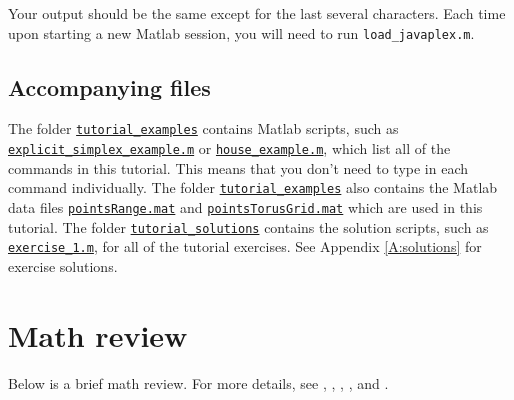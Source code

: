 \documentclass[amscd, amssymb, verbatim]{amsart}[12pt]
\theoremstyle{remark}
\theoremstyle{remark}
\theoremstyle{remark}
\begin{document}
Your output should be the same except for the last several characters. Each time upon starting a new Matlab session, you will need to run \texttt{load\_javaplex.m}.


\subsection{Accompanying files}

The folder \href{https://github.com/appliedtopology/javaplex/tree/master/src/matlab/for_distribution/tutorial_examples}{\texttt{tutorial\_examples}} contains Matlab scripts, such as \\ %
\href{https://github.com/appliedtopology/javaplex/tree/master/src/matlab/for_distribution/tutorial_examples/explicit_simplex_example.m}{\texttt{explicit\_simplex\_example.m}} or \href{https://github.com/appliedtopology/javaplex/tree/master/src/matlab/for_distribution/tutorial_examples/house_example.m}{\texttt{house\_example.m}}, which list all of the commands in this tutorial. This means that you don't need to type in each command individually. The folder \href{https://github.com/appliedtopology/javaplex/tree/master/src/matlab/for_distribution/tutorial_examples}{\texttt{tutorial\_examples}} also contains the Matlab data files \href{https://github.com/appliedtopology/javaplex/tree/master/src/matlab/for_distribution/tutorial_examples/pointsRange.mat}{\texttt{pointsRange.mat}} and \href{https://github.com/appliedtopology/javaplex/tree/master/src/matlab/for_distribution/tutorial_examples/pointsTorusGrid.mat}{\texttt{pointsTorusGrid.mat}} which are used in this tutorial. The folder \href{https://github.com/appliedtopology/javaplex/tree/master/src/matlab/for_distribution/tutorial_solutions}{\texttt{tutorial\_solutions}} contains the solution scripts, such as \href{https://github.com/appliedtopology/javaplex/tree/master/src/matlab/for_distribution/tutorial_solutions/exercise_1.m}{\texttt{exercise\_1.m}}, for all of the tutorial exercises. See Appendix \ref{A:solutions} for exercise solutions.




\section{Math review}

Below is a brief math review. For more details, see \citet{Armstrong}, \citet{ComputationalTopology}, \citet{TopologicalPersistence}, \citet{Hatcher}, and \citet{ComputingPersistent}. 
\end{document}
